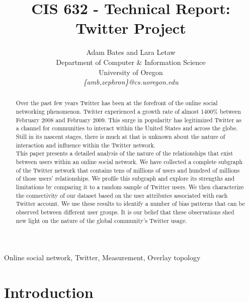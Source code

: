 \documentclass[10pt,twocolumn]{IEEEtran11}
\begin{document}


\title{\Large \bf CIS 632 - Technical Report: Twitter Project
}

\author{Adam Bates and Lara Letaw\\
Department of Computer \& Information Science\\
University of Oregon\\
\textit{\{amb,zephron\}@cs.uoregon.edu}}

\maketitle
\pagestyle{empty}
\begin{abstract}
Over the past few years Twitter has been at the forefront of the online social networking phenomenon.  Twitter experienced a growth rate of almost 1400\% between February 2008 and February 2009.  This surge in popularity has legitimized Twitter as a channel for communities to interact within the United States and across the globe.  Still in its nascent stages, there is much at that is unknown about the nature of interaction and influence within the Twitter network.\\
This paper presents a detailed analysis of the nature of the relationships that exist between users within an online social network.  We have collected a complete subgraph of the Twitter network that contains tens of millions of users and hundred of millions of those users' relationships.  We profile this subgraph and explore its strengths and limitations by comparing it to a random sample of Twitter users.  We then characterize the connectivity of our dataset based on the user attributes associated with each Twitter account.  We use these results to identify a number of bias patterns that can be observed between different user groups.  It is our belief that these observations shed new light on the nature of the global community's Twitter usage.\\
\end{abstract}

\begin{keywords} 
Online social network, Twitter, Measurement, Overlay topology
\end{keywords}

\section{Introduction}

\end{document}
